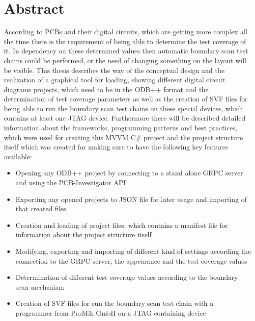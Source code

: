 \chapter{Abstract}
According to \ac{PCB}s and their digital circuits, which are getting more complex all the time there is the requirement of being able to determine the test coverage of it. In dependency on these determined values then automatic boundary scan test chains could be performed, or the need of changing something on the layout will be visible. This thesis describes the way of the conceptual design and the realization of a graphical tool for loading, showing different digital circuit diagrams projects, which need to be in the \ac{ODB}++ format and the determination of test coverage parameters as well as the creation of \ac{SVF} files for being able to run the boundary scan test chains on these special devices, which contains at least one \ac{JTAG} device. Furthermore there will be described detailed information about the frameworks, programming patterns and best practices, which were used for creating this \ac{MVVM} C\# project and the project structure itself which was created for making sure to have the following key features available:
\begin{itemize}
	\item Opening any \ac{ODB}++ project by connecting to a stand alone \ac{GRPC} server and using the \ac{PCB}-Investigator API
	\item Exporting any opened projects to \ac{JSON} file for later usage and importing of that created files
	\item Creation and loading of project files, which contains a manifest file for information about the project structure itself
	\item Modifying, exporting and importing of different kind of settings according the connection to the \ac{GRPC} server, the appearance and the test coverage values
	\item Determination of different test coverage values according to the boundary scan mechanism
	\item Creation of \ac{SVF} files for run the boundary scan test chain with a programmer from ProMik GmbH on a \ac{JTAG} containing device
\end{itemize}